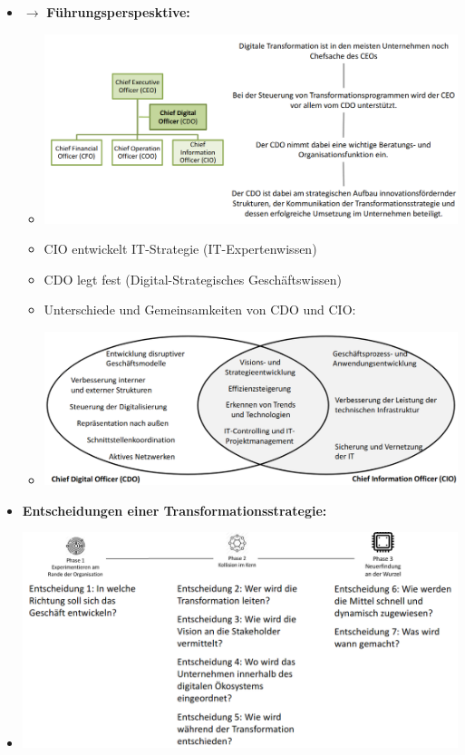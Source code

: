 \documentclass[12pt,a4paper]{article}
\begin{document}
\begin{itemize}
   \item[] $\rightarrow$ \textbf{Führungsperspesktive:}
         \begin{itemize}
            \item[] \includegraphics[scale=0.35]{ceo.png}
            \item CIO entwickelt IT-Strategie (IT-Expertenwissen)
            \item CDO legt fest (Digital-Strategisches Geschäftswissen)
            \item Unterschiede und Gemeinsamkeiten von CDO und CIO:
            \item[] \includegraphics[scale=0.45]{ciocdo.png}
         \end{itemize}
         
\newpage %
   \item \textbf{Entscheidungen einer Transformationsstrategie:}
   \item[] \includegraphics[scale=0.35]{dec.png}
\end{itemize}
\end{document}
